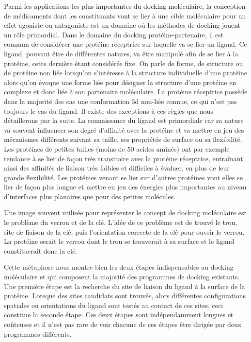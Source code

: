 Parmi les applications les plus importantes du docking moléculaire, la conception de médicaments dont les constituants vont se lier à une cible moléculaire pour un effet agoniste ou antagoniste est un domaine où les méthodes de docking jouent un rôle primordial.
Dans le domaine du docking protéine-partenaire, il est commun de considérer une protéine réceptrice sur laquelle va se lier un ligand. Ce ligand, pouvant être de différentes natures, va être manipulé afin de se lier à la protéine, cette dernière étant considérée fixe. On parle de forme, de structure ou de protéine non liée lorsqu'on s'intéresse à la structure individuelle d'une protéine alors qu'on évoque une forme liée pour désigner la structure d'une protéine en complexe et donc liée à son partenaire moléculaire. 
La protéine réceptrice possède dans la majorité des cas une conformation 3d non-liée connue, ce qui n'est pas toujours le cas du ligand. Il existe des exceptions à ces règles que nous détaillerons par la suite. La connaissance du ligand est primordiale car sa nature va souvent influencer son degré d'affinité avec la protéine et va mettre en jeu des mécanismes différents suivant sa taille, ses propriétés de surface ou sa flexibilité. Les protéines de petites tailles (moins de 50 acides aminés) ont par exemple tendance à se lier de façon très transitoire avec la protéine réceptrice, entraînant ainsi des affinités de liaison très faibles et difficiles à évaluer, en plus de leur grande flexibilité. Les protéines venant se lier sur d'autres protéines vont elles se lier de façon plus longue et mettre en jeu des énergies plus importantes au niveau d'interfaces plus planaires que pour des petites molécules.

Une image souvent utilisée pour représenter le concept de docking moléculaire est le problème du verrou et de la clé. L'idée de ce problème est de trouvé le trou, site de liaison de la clé, puis l'orientation correcte de la clé pour ouvrir le verrou. La protéine serait le verrou dont le trou se trouverait à sa surface et le ligand constituerait donc la clé.

Cette métaphore nous montre bien les deux étapes indispensables au docking moléculaire et qui composent la majorité des programmes de docking existants. Une première étape est la recherche du site de liaison du ligand à la surface de la protéine. Lorsque des sites candidats sont trouvés, alors différentes configurations spatiales ou orientations du ligand sont testés au contact de ces sites, ceci constitue la seconde étape. Ces deux étapes sont indépendamment longues et coûteuses et il n'est pas rare de voir chacune de ces étapes être dirigée par deux programmes différents.

